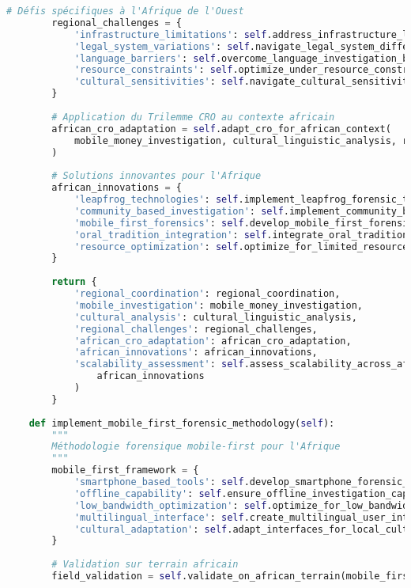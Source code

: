 \begin{lstlisting}[language=Python, caption=Investigation transfrontalière africaine mobile money]
        # Défis spécifiques à l'Afrique de l'Ouest
        regional_challenges = {
            'infrastructure_limitations': self.address_infrastructure_limitations(),
            'legal_system_variations': self.navigate_legal_system_differences(),
            'language_barriers': self.overcome_language_investigation_barriers(),
            'resource_constraints': self.optimize_under_resource_constraints(),
            'cultural_sensitivities': self.navigate_cultural_sensitivities()
        }
        
        # Application du Trilemme CRO au contexte africain
        african_cro_adaptation = self.adapt_cro_for_african_context(
            mobile_money_investigation, cultural_linguistic_analysis, regional_challenges
        )
        
        # Solutions innovantes pour l'Afrique
        african_innovations = {
            'leapfrog_technologies': self.implement_leapfrog_forensic_technologies(),
            'community_based_investigation': self.implement_community_based_approaches(),
            'mobile_first_forensics': self.develop_mobile_first_forensic_solutions(),
            'oral_tradition_integration': self.integrate_oral_tradition_methodologies(),
            'resource_optimization': self.optimize_for_limited_resources()
        }
        
        return {
            'regional_coordination': regional_coordination,
            'mobile_investigation': mobile_money_investigation,
            'cultural_analysis': cultural_linguistic_analysis,
            'regional_challenges': regional_challenges,
            'african_cro_adaptation': african_cro_adaptation,
            'african_innovations': african_innovations,
            'scalability_assessment': self.assess_scalability_across_africa(
                african_innovations
            )
        }
    
    def implement_mobile_first_forensic_methodology(self):
        """
        Méthodologie forensique mobile-first pour l'Afrique
        """
        mobile_first_framework = {
            'smartphone_based_tools': self.develop_smartphone_forensic_tools(),
            'offline_capability': self.ensure_offline_investigation_capability(),
            'low_bandwidth_optimization': self.optimize_for_low_bandwidth(),
            'multilingual_interface': self.create_multilingual_user_interfaces(),
            'cultural_adaptation': self.adapt_interfaces_for_local_cultures()
        }
        
        # Validation sur terrain africain
        field_validation = self.validate_on_african_terrain(mobile_first_framework)
        

\end{lstlisting}
